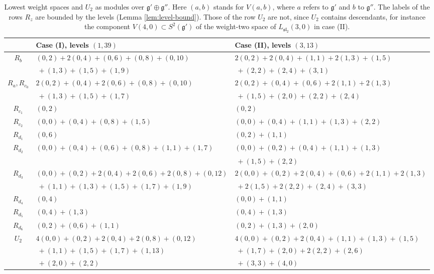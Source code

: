 \documentclass[leqno]{article}
\numberwithin{equation}{section}
\begin{document}
\begin{table}[ht]
\centering
\footnotesize
\setlength{\tabcolsep}{2.5pt}
\renewcommand{\arraystretch}{1.2}
\begin{tabular}{c|l|l}
 & Case (I), levels $(1,39)$ & Case (II), levels $(3,13)$\\
\hline
$R_b$ & $(0,2)+2(0,4)+(0,6)+(0,8)+(0,10)$ & $2(0,2)+2(0,4)+(1,1)+2(1,3)+(1,5)$\\
 & $\ +(1,3)+(1,5)+(1,9)$ & $\ +(2,2)+(2,4)+(3,1)$\\
$R_a, R_{c_0}$ & $2(0,2)+(0,4)+2(0,6)+(0,8)+(0,10)$ & $2(0,2)+(0,4)+(0,6)+2(1,1)+2(1,3)$\\
 & $\ +(1,3)+(1,5)+(1,7)$ & $\ +(1,5)+(2,0)+(2,2)+(2,4)$\\
$R_{c_1}$ & $(0,2)$ & $(0,2)$\\
$R_{c_2}$ & $(0,0)+(0,4)+(0,8)+(1,5)$ & $(0,0)+(0,4)+(1,1)+(1,3)+(2,2)$\\
$R_{d_1}$ & $(0,6)$ & $(0,2)+(1,1)$\\
$R_{d_2}$ & $(0,0)+(0,4)+(0,6)+(0,8)+(1,1)+(1,7)$ & $(0,0)+(0,2)+(0,4)+(1,1)+(1,3)$\\
 & & $\ +(1,5)+(2,2)$\\
$R_{d_3}$ & $(0,0)+(0,2)+2(0,4)+2(0,6)+2(0,8)+(0,12)$ & $2(0,0)+(0,2)+2(0,4)+(0,6)+2(1,1)+2(1,3)$\\
 & $\ +(1,1)+(1,3)+(1,5)+(1,7)+(1,9)$ & $\ +2(1,5)+2(2,2)+(2,4)+(3,3)$\\
$R_{d_4}$ & $(0,4)$ & $(0,0)+(1,1)$\\
$R_{d_5}$ & $(0,4)+(1,3)$ & $(0,4)+(1,3)$\\
$R_{d_6}$ & $(0,2)+(0,6)+(1,1)$ & $(0,2)+(1,3)+(2,0)$\\
\hline
$U_2$ & $4(0,0)+(0,2)+2(0,4)+2(0,8)+(0,12)$ & $4(0,0)+(0,2)+2(0,4)+(1,1)+(1,3)+(1,5)$\\
 & $\ +(1,1)+(1,5)+(1,7)+(1,13)$ & $\ +(1,7)+(2,0)+2(2,2)+(2,6)$\\
 & $\ +(2,0)+(2,2)$ & $\ +(3,3)+(4,0)$
\end{tabular}
\caption{Lowest weight spaces and $U_2$ as modules over $\mathfrak g' \oplus \mathfrak g''$. Here $(a,b)$ stands for $V(a,b)$, where $a$ refers to $\mathfrak g'$ and $b$ to $\mathfrak g''$. The labels of the rows $R_z$ are bounded by the levels (Lemma \ref{lem:level-bound}). Those of the row $U_2$ are not, since $U_2$ contains descendants, for instance the component $V(4,0) \subset S^2(\mathfrak g')$ of the weight-two space of $L_{\mathfrak{sl}_2}(3,0)$ in case (II).}
\label{tab:lowest-spaces}
\end{table}
\end{document}
